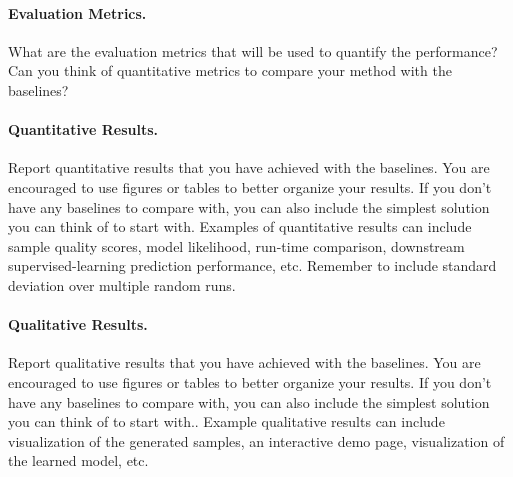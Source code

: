 \documentclass{article}
\newcommand{\new}[1]{{\color{red} #1}}
\begin{document}
\paragraph{Evaluation Metrics.}
What are the evaluation metrics that will be used to quantify the performance? Can you think of quantitative metrics to compare your method with the baselines? 

\new{
\paragraph{Quantitative Results.}
Report quantitative results that you have achieved with the baselines.
You are encouraged to use figures or tables to better organize your results. If you don't have any baselines to compare with, you can also include the simplest solution you can think of to start with. Examples of quantitative results can include sample quality scores, model likelihood, run-time comparison, downstream supervised-learning prediction performance, etc. Remember to include standard deviation over multiple random runs.
}

\new{
\paragraph{Qualitative Results.}
Report qualitative results that you have achieved with the baselines.
 You are encouraged to use figures or tables to better organize your results. If you don't have any baselines to compare with, you can also include the simplest solution you can think of to start with.. Example qualitative results can include visualization of the generated samples, an interactive demo page, visualization of the learned model, etc. 
 }


\end{document}
